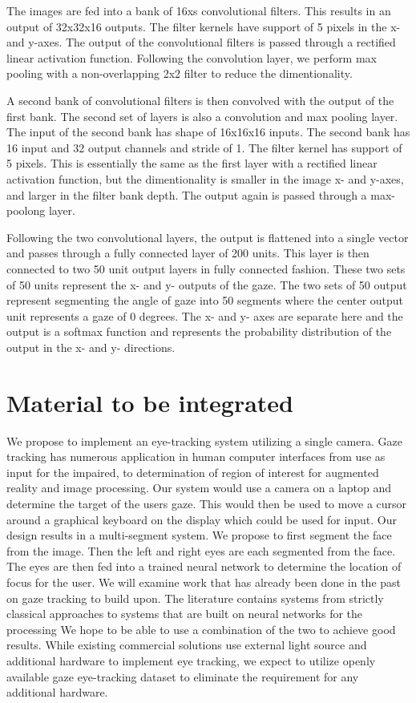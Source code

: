 \documentclass[10pt,twocolumn,letterpaper]{article}
\begin{document}
The images are fed into a bank of 16xs convolutional
filters. This results in an output of 32x32x16 outputs. The filter
kernels have support of 5 pixels in the x- and y-axes. The output of
the convolutional filters is passed through a rectified linear
activation function. Following the convolution layer, we perform max pooling with a
non-overlapping 2x2 filter to reduce the dimentionality.

A second bank of convolutional filters is then convolved with the
output of the first bank. The second set of layers is also a
convolution and max pooling layer. The input of the second bank has
shape of 16x16x16 inputs. The second bank has 16 input and 32 output
channels and stride of 1. The filter kernel has support of 5
pixels. This is essentially the same as the first layer with a
rectified linear activation function, but the dimentionality is
smaller in the image x- and y-axes, and larger in the filter bank
depth. The output again is passed through a max-poolong layer.

Following the two convolutional layers, the output is flattened into a
single vector and passes through a fully connected layer of 200
units. This layer is then connected to two 50 unit output layers in
fully connected fashion. These two sets of 50 units represent the x-
and y- outputs of the gaze. The two sets of 50 output represent
segmenting the angle of gaze into 50 segments where the center output
unit represents a gaze of 0 degrees. The x- and y- axes are separate
here and the output is a softmax function and represents the
probability distribution of the output in the x- and y- directions.




\section{Material to be integrated}


We propose to implement an eye-tracking system utilizing a single
camera. Gaze tracking has numerous application in human computer
interfaces from use as input for the impaired\cite{calvo}, to
determination of region of interest for augmented reality and image
processing. Our system would use a camera on a laptop and determine
the target of the users gaze. This would then be used to move a cursor
around a graphical keyboard on the display which could be used for
input. Our design results in a multi-segment system. We propose to
first segment the face from the image. Then the left and right eyes
are each segmented from the face. The eyes are then fed into a trained
neural network to determine the location of focus for the user. We
will examine work that has already been done in the past on gaze
tracking to build upon. The literature contains systems from strictly
classical approaches to systems that are built on neural networks for
the processing  We hope to be able to use a
combination of the two to achieve good results. While existing
commercial solutions use external light source and additional hardware
to implement eye tracking, we expect to utilize openly available gaze
eye-tracking dataset to eliminate the requirement for any additional
hardware.
\end{document}
